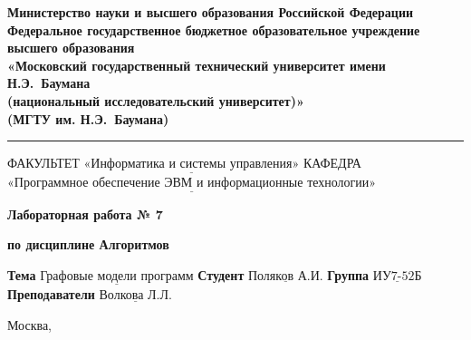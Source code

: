 \thispagestyle{empty}

\noindent\begin{minipage}{\textwidth}\centering
	\textbf{Министерство науки и высшего образования Российской Федерации}\\
	\textbf{Федеральное государственное бюджетное образовательное учреждение высшего образования}\\
	\textbf{«Московский государственный технический университет имени Н.Э.~Баумана}\\
	\textbf{(национальный исследовательский университет)»}\\
	\textbf{(МГТУ им. Н.Э.~Баумана)}
\end{minipage}

\noindent\rule{\linewidth}{3pt}
\newline\newline
\noindent ФАКУЛЬТЕТ $\underline{\text{«Информатика и системы управления»}}$ \newline\newline
\noindent КАФЕДРА $\underline{\text{«Программное обеспечение ЭВМ и информационные технологии»}}$

\vspace{1cm}

\begin{center}
	\noindent\centering
		\Large\textbf{Лабораторная работа № 7}
\end{center}

\begin{center}
	\noindent\centering
		\Large\textbf{по дисциплине  Алгоритмов\guillemotright}
\end{center}

\noindent\textbf{Тема} $\underline{\text{Графовые модели программ}}$\newline\newline
\noindent\textbf{Студент} $\underline{\text{Поляков А.И.}}$\newline\newline
\noindent\textbf{Группа} $\underline{\text{ИУ7-52Б}}$\newline\newline
\noindent\textbf{Преподаватели} $\underline{\text{Волкова Л.Л.}}$\newline

\begin{center}
	\vfill
	Москва,~\the\year
\end{center}
\clearpage